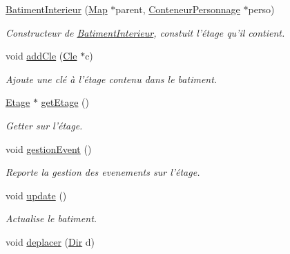 \begin{DoxyCompactItemize}
\item 
\hyperlink{classBatimentInterieur_af25be1c0945da60ef6d6b07a424138a4}{Batiment\-Interieur} (\hyperlink{classMap}{Map} $\ast$parent, \hyperlink{classConteneurPersonnage}{Conteneur\-Personnage} $\ast$perso)
\begin{DoxyCompactList}\small\item\em Constructeur de \hyperlink{classBatimentInterieur}{Batiment\-Interieur}, constuit l'étage qu'il contient. \end{DoxyCompactList}\item 
void \hyperlink{classBatimentInterieur_a9a2d6221b8b4e124dfc3a0a1ddf36b77}{add\-Cle} (\hyperlink{classCle}{Cle} $\ast$c)
\begin{DoxyCompactList}\small\item\em Ajoute une clé à l'étage contenu dans le batiment. \end{DoxyCompactList}\item 
\hyperlink{classEtage}{Etage} $\ast$ \hyperlink{classBatimentInterieur_ae6310609f6217b1c0b9200f6d12c4fbe}{get\-Etage} ()
\begin{DoxyCompactList}\small\item\em Getter sur l'étage. \end{DoxyCompactList}\item 
\hypertarget{classBatimentInterieur_a48a57182808c9540e86fe315b7f59b86}{void \hyperlink{classBatimentInterieur_a48a57182808c9540e86fe315b7f59b86}{gestion\-Event} ()}\label{classBatimentInterieur_a48a57182808c9540e86fe315b7f59b86}

\begin{DoxyCompactList}\small\item\em Reporte la gestion des evenements sur l'étage. \end{DoxyCompactList}\item 
\hypertarget{classBatimentInterieur_a6d120a52d45f69846fd61fc94edfd058}{void \hyperlink{classBatimentInterieur_a6d120a52d45f69846fd61fc94edfd058}{update} ()}\label{classBatimentInterieur_a6d120a52d45f69846fd61fc94edfd058}

\begin{DoxyCompactList}\small\item\em Actualise le batiment. \end{DoxyCompactList}\item 
\hypertarget{classBatimentInterieur_a9fbbbd49eecc958f27734fce15c76519}{void \hyperlink{classBatimentInterieur_a9fbbbd49eecc958f27734fce15c76519}{deplacer} (\hyperlink{Espace_8h_a7cf6e8c5a5bc5e7b2afef3647870b1c4}{Dir} d)}\label{classBatimentInterieur_a9fbbbd49eecc958f27734fce15c76519}


\end{DoxyCompactItemize}
